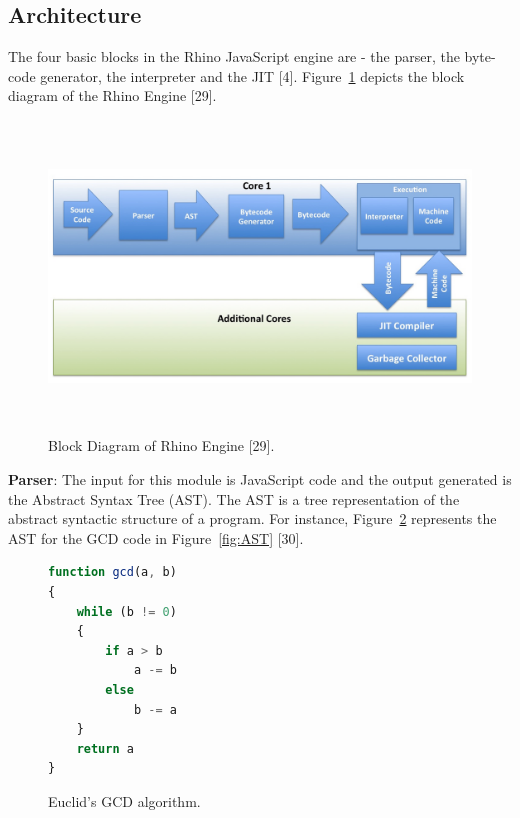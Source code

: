 \subsection{Architecture}
The four basic blocks in the Rhino JavaScript engine are - the parser, the byte-code generator, the interpreter and the JIT [4]. Figure~\ref{fig:architecture} depicts the block diagram of the Rhino Engine [29].

\begin{figure}
  \centering
      \includegraphics[width=15cm, height=8.25cm]{rhino.jpg}
    \caption[Block Diagram of Rhino Engine]{Block Diagram of Rhino Engine [29].}
    \label{fig:architecture}
\end{figure}

\textbf{Parser}: The input for this module is JavaScript code and the output generated is the Abstract Syntax Tree (AST). The AST is a tree representation of the abstract syntactic structure of a program. For instance, Figure~\ref{fig:ASTcode} represents the AST for the GCD code in Figure~\ref{fig:AST} [30].

\begin{figure}
  \centering
\begin{lstlisting}[language=JavaScript] 
function gcd(a, b)
{
	while (b != 0)
    {
    	if a > b
        	a -= b
        else
        	b -= a
    }
    return a
}
\end{lstlisting}
    \caption[Euclid's GCD algorithm]{Euclid's GCD algorithm.}
    \label{fig:ASTcode}
\end{figure}

